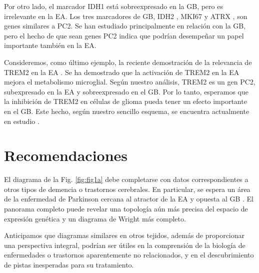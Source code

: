 Por otro lado, el marcador IDH1 \cite{Cohen_2013} está sobreexpresado en la GB, pero es irrelevante en la EA. Los tres marcadores de GB, IDH2 \cite{Cohen_2013}, MKI67 \cite{Chen_2015} y ATRX \cite{Haase_2018}, son genes similares a PC2. Se han estudiado principalmente en relación con la GB, pero el hecho de que sean genes PC2 indica que podrían desempeñar un papel importante también en la EA.

Consideremos, como último ejemplo, la reciente demostración de la relevancia de TREM2 en la EA \cite{van_Lengerich_2023}. Se ha demostrado que la activación de TREM2 en la EA mejora el metabolismo microglial. Según nuestro análisis, TREM2 es un gen PC2, subexpresado en la EA y sobreexpresado en el GB. Por lo tanto, esperamos que la inhibición de TREM2 en células de glioma pueda tener un efecto importante en el GB. Este hecho, según nuestro sencillo esquema, se encuentra actualmente en estudio \cite{Sun_2023}.

\chapter*{Recomendaciones}\label{recomendations}

El diagrama de la Fig. \ref{fig:fig1a} debe completarse con datos correspondientes a otros tipos de demencia o trastornos cerebrales. En particular, se espera un área de la enfermedad de Parkinson cercana al atractor de la EA y opuesta al GB \cite{Mencke_2020}. El panorama completo puede revelar una topología aún más precisa del espacio de expresión genética y un diagrama de Wright más completo.

Anticipamos que diagramas similares en otros tejidos, además de proporcionar una perspectiva integral, podrían ser útiles en la comprensión de la biología de enfermedades o trastornos aparentemente no relacionados, y en el descubrimiento de pistas inesperadas para su tratamiento.
